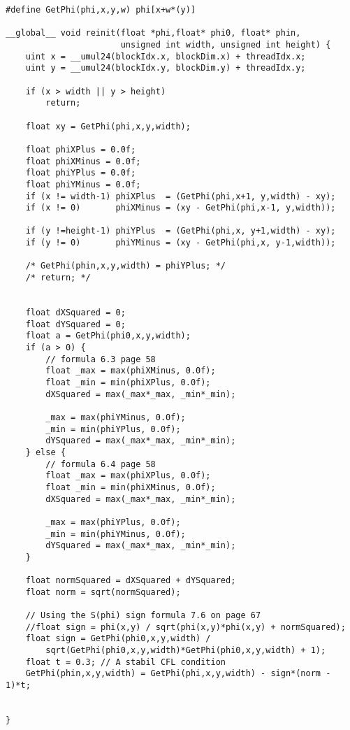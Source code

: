 \begin{lstlisting}
#define GetPhi(phi,x,y,w) phi[x+w*(y)]

__global__ void reinit(float *phi,float* phi0, float* phin, 
                       unsigned int width, unsigned int height) {
    uint x = __umul24(blockIdx.x, blockDim.x) + threadIdx.x;
    uint y = __umul24(blockIdx.y, blockDim.y) + threadIdx.y;

    if (x > width || y > height)
        return;
    
    float xy = GetPhi(phi,x,y,width);

    float phiXPlus = 0.0f;
    float phiXMinus = 0.0f;
    float phiYPlus = 0.0f;
    float phiYMinus = 0.0f;        	
    if (x != width-1) phiXPlus  = (GetPhi(phi,x+1, y,width) - xy);
    if (x != 0)       phiXMinus = (xy - GetPhi(phi,x-1, y,width));
    
    if (y !=height-1) phiYPlus  = (GetPhi(phi,x, y+1,width) - xy);
    if (y != 0)       phiYMinus = (xy - GetPhi(phi,x, y-1,width));

    /* GetPhi(phin,x,y,width) = phiYPlus; */
    /* return; */


    float dXSquared = 0;
    float dYSquared = 0;
    float a = GetPhi(phi0,x,y,width);
    if (a > 0) {
        // formula 6.3 page 58
        float _max = max(phiXMinus, 0.0f);
        float _min = min(phiXPlus, 0.0f);
        dXSquared = max(_max*_max, _min*_min);
                    
        _max = max(phiYMinus, 0.0f);
        _min = min(phiYPlus, 0.0f);
        dYSquared = max(_max*_max, _min*_min);
    } else {
        // formula 6.4 page 58
        float _max = max(phiXPlus, 0.0f);
        float _min = min(phiXMinus, 0.0f);
        dXSquared = max(_max*_max, _min*_min);
                    
        _max = max(phiYPlus, 0.0f);
        _min = min(phiYMinus, 0.0f);
        dYSquared = max(_max*_max, _min*_min);        				
    }

    float normSquared = dXSquared + dYSquared;           
    float norm = sqrt(normSquared);

    // Using the S(phi) sign formula 7.6 on page 67
    //float sign = phi(x,y) / sqrt(phi(x,y)*phi(x,y) + normSquared);
    float sign = GetPhi(phi0,x,y,width) / 
        sqrt(GetPhi(phi0,x,y,width)*GetPhi(phi0,x,y,width) + 1);
    float t = 0.3; // A stabil CFL condition
    GetPhi(phin,x,y,width) = GetPhi(phi,x,y,width) - sign*(norm - 1)*t;


}
\end{lstlisting}

